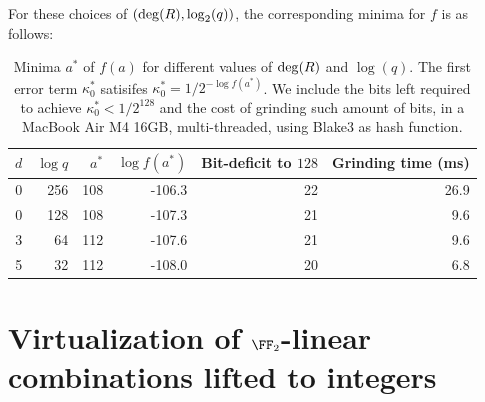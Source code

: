 \documentclass[11pt,letterpaper,usenames,dvipsnames]{article}
\begin{document}
    For these choices of $(\deg(R),\log_2(q))$, the corresponding minima for $f$ is as follows:
\begin{table}[H]
  \centering
  \begin{tabular}{rrrrrr}
    \toprule
    $d$ & $\log q$ & $a^{*}$ & $\log f(a^{*})$ & Bit-deficit to $128$ & Grinding time (ms) \\
    \midrule
    0 & 256 & 108 & -106.3 & 22& 26.9  \\
    0 & 128 & 108 & -107.3 & 21 & 9.6 \\
    3 & 64 & 112 & -107.6 & 21 & 9.6\\
   5 & 32 & 112 & -108.0 & 20 & 6.8\\
    \bottomrule
  \end{tabular}
  \caption{Minima $a^{*}$ of $f(a)$ for different values of $\deg(R)$ and $\log(q)$. The first error term $\kappa_0^*$ satisifes $\kappa_0^* = 1/2^{-\log f(a^*)}$. We include the bits left required to achieve  $\kappa_0^* < 1/2^{128}$ and the cost of grinding such amount of bits, in a MacBook Air M4 16GB, multi-threaded, using Blake3 as hash function.}
  \label{tab:min-f}
\end{table}

\section{Virtualization of $\FF_2$-linear combinations lifted to integers}\label{s:virtualization}

\newcommand{\virtual}{\mathsf{virtual}}

%

\end{document}
